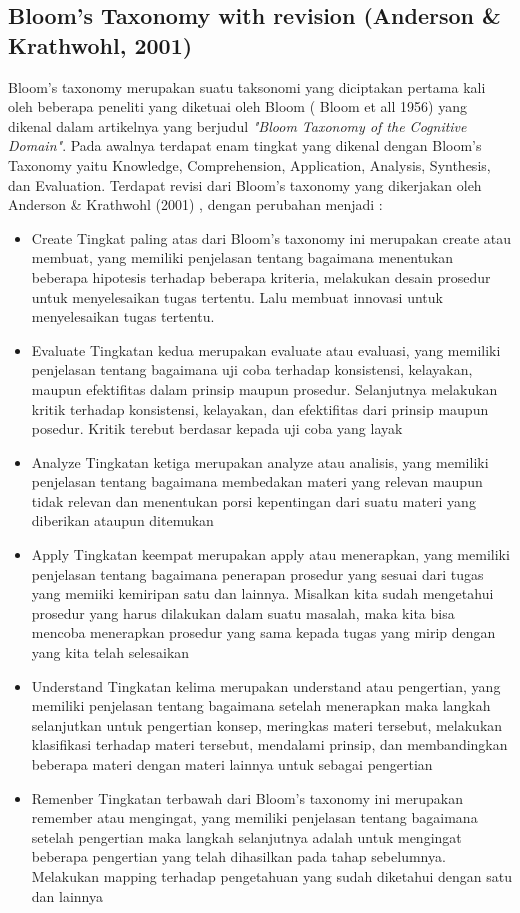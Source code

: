 	\subsection{Bloom's Taxonomy with revision (Anderson \& Krathwohl, 2001)}
	Bloom's taxonomy merupakan suatu taksonomi yang diciptakan pertama kali oleh beberapa peneliti yang diketuai oleh Bloom ( Bloom et all 1956) yang dikenal dalam artikelnya yang berjudul \textit{"Bloom Taxonomy of the Cognitive Domain"}. Pada awalnya terdapat enam tingkat yang dikenal dengan Bloom's Taxonomy yaitu Knowledge, Comprehension, Application, Analysis, Synthesis, dan Evaluation. 
	\linebreak \linebreak
	Terdapat revisi dari Bloom's taxonomy yang dikerjakan oleh Anderson \& Krathwohl (2001) , dengan perubahan menjadi :
	\begin{itemize}
		\item Create
			\subitem Tingkat paling atas dari Bloom's taxonomy ini merupakan create atau membuat, yang memiliki penjelasan tentang bagaimana menentukan beberapa hipotesis terhadap beberapa kriteria, melakukan desain prosedur untuk menyelesaikan tugas tertentu. Lalu membuat innovasi untuk menyelesaikan tugas tertentu.
		\item Evaluate
			\subitem Tingkatan kedua merupakan evaluate atau evaluasi, yang memiliki penjelasan tentang bagaimana uji coba terhadap konsistensi, kelayakan, maupun efektifitas dalam prinsip maupun prosedur. Selanjutnya melakukan kritik terhadap konsistensi, kelayakan, dan efektifitas dari prinsip maupun posedur. Kritik terebut berdasar kepada uji coba yang layak
		\item Analyze
			\subitem Tingkatan ketiga merupakan analyze atau analisis, yang memiliki penjelasan tentang bagaimana membedakan materi yang relevan maupun tidak relevan dan menentukan porsi kepentingan dari suatu materi yang diberikan ataupun ditemukan
		\item Apply
			\subitem Tingkatan keempat merupakan apply atau menerapkan, yang memiliki penjelasan tentang bagaimana penerapan prosedur yang sesuai dari tugas yang memiiki kemiripan satu dan lainnya. Misalkan kita sudah mengetahui prosedur yang harus dilakukan dalam suatu masalah, maka kita bisa mencoba menerapkan prosedur yang sama kepada tugas yang mirip dengan yang kita telah selesaikan
		\item Understand
			\subitem Tingkatan kelima merupakan understand atau pengertian, yang memiliki penjelasan tentang bagaimana setelah menerapkan maka langkah selanjutkan untuk pengertian konsep, meringkas materi tersebut, melakukan klasifikasi terhadap materi tersebut, mendalami prinsip, dan membandingkan beberapa materi dengan materi lainnya untuk sebagai pengertian
		\item Remenber
			\subitem Tingkatan terbawah dari Bloom's taxonomy ini merupakan remember atau mengingat, yang memiliki penjelasan tentang bagaimana setelah pengertian maka langkah selanjutnya adalah untuk mengingat beberapa pengertian yang telah dihasilkan pada tahap sebelumnya. Melakukan mapping terhadap pengetahuan yang sudah diketahui dengan satu dan lainnya
		
	\end{itemize}
